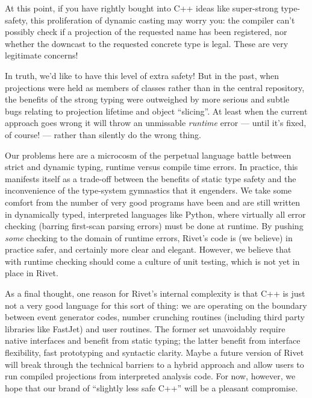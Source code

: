 \documentclass{JHEP3}
\begin{document}
\begin{philosophy}
  At this point, if you have rightly bought into C++ ideas like super-strong
  type-safety, this proliferation of dynamic casting may worry you: the compiler
  can't possibly check if a projection of the requested name has been
  registered, nor whether the downcast to the requested concrete type is
  legal. These are very legitimate concerns!

  In truth, we'd like to have this level of extra safety! But in the past, when
  projections were held as members of  classes rather
  than in the central  repository, the benefits of the
  strong typing were outweighed by more serious and subtle bugs relating to
  projection lifetime and object ``slicing''. At least when the current approach
  goes wrong it will throw an unmissable \emph{runtime} error --- until it's
  fixed, of course! --- rather than silently do the wrong thing.

  Our problems here are a microcosm of the perpetual language battle between
  strict and dynamic typing, runtime versus compile time errors. In practice,
  this manifests itself as a trade-off between the benefits of static type
  safety and the inconvenience of the type-system gymnastics that it engenders.
  We take some comfort from the number of very good programs have been and are
  still written in dynamically typed, interpreted languages like Python, where
  virtually all error checking (barring first-scan parsing errors) must be done
  at runtime. By pushing \emph{some} checking to the domain of runtime errors,
  Rivet's code is (we believe) in practice safer, and certainly more clear and
  elegant. However, we believe that with runtime checking should come a culture
  of unit testing, which is not yet in place in Rivet.

  As a final thought, one reason for Rivet's internal complexity is that C++ is
  just not a very good language for this sort of thing: we are operating on the
  boundary between event generator codes, number crunching routines (including
  third party libraries like FastJet) and user routines. The former set
  unavoidably require native interfaces and benefit from static typing; the
  latter benefit from interface flexibility, fast prototyping and syntactic
  clarity. Maybe a future version of Rivet will break through the technical
  barriers to a hybrid approach and allow users to run compiled projections from
  interpreted analysis code. For now, however, we hope that our brand of
  ``slightly less safe C++'' will be a pleasant compromise.
\end{philosophy}
\end{document}
